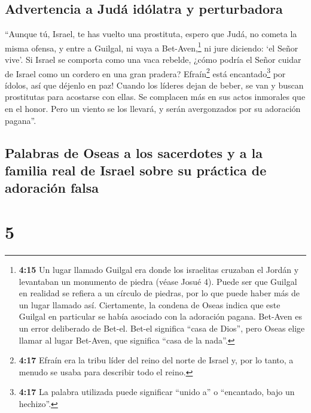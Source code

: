 \hypertarget{advertencia-a-juduxe1-iduxf3latra-y-perturbadora}{%
\subsection{Advertencia a Judá idólatra y
perturbadora}\label{advertencia-a-juduxe1-iduxf3latra-y-perturbadora}}

 ``Aunque tú, Israel, te has vuelto una prostituta,
espero que Judá, no cometa la misma ofensa, y entre a Guilgal, ni vaya a
Bet-Aven,\footnote{\textbf{4:15} Un lugar llamado Guilgal era donde los
  israelitas cruzaban el Jordán y levantaban un monumento de piedra
  (véase Josué 4). Puede ser que Guilgal en realidad se refiera a un
  círculo de piedras, por lo que puede haber más de un lugar llamado
  así. Ciertamente, la condena de Oseas indica que este Guilgal en
  particular se había asociado con la adoración pagana. Bet-Aven es un
  error deliberado de Bet-el. Bet-el significa ``casa de Dios'', pero
  Oseas elige llamar al lugar Bet-Aven, que significa ``casa de la
  nada''.} ni jure diciendo: `el Señor vive'.  Si Israel
se comporta como una vaca rebelde, ¿cómo podría el Señor cuidar de
Israel como un cordero en una gran pradera? 
Efraín\footnote{\textbf{4:17} Efraín era la tribu líder del reino del
  norte de Israel y, por lo tanto, a menudo se usaba para describir todo
  el reino.} está encantado\footnote{\textbf{4:17} La palabra utilizada
  puede significar ``unido a'' o ``encantado, bajo un hechizo''.} por
ídolos, así que déjenlo en paz!  Cuando los líderes dejan
de beber, se van y buscan prostitutas para acostarse con ellas. Se
complacen más en sus actos inmorales que en el honor. 
Pero un viento se los llevará, y serán avergonzados por su adoración
pagana''.

\hypertarget{palabras-de-oseas-a-los-sacerdotes-y-a-la-familia-real-de-israel-sobre-su-pruxe1ctica-de-adoraciuxf3n-falsa}{%
\subsection{Palabras de Oseas a los sacerdotes y a la familia real de
Israel sobre su práctica de adoración
falsa}\label{palabras-de-oseas-a-los-sacerdotes-y-a-la-familia-real-de-israel-sobre-su-pruxe1ctica-de-adoraciuxf3n-falsa}}

\hypertarget{section-4}{%
\section{5}\label{section-4}}


